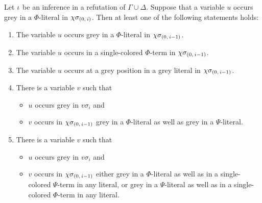 \documentclass[,%
	draft=false,%
	numbers=noendperiod
	12pt,
	a4paper,
	oneside,%
	openany,
]{memoir}
\newcommand{\inv}{\ensuremath{\chi}}
\begin{document}
\begin{lemma}
	\label{lemma:var_grey_col_lit}
	Let $\iota$ be an inference in a refutation of $\Gamma\cup\Delta$.
	Suppose that a variable $u$ occurs grey in a $\Phi$-literal in $\inv\sigmazi$.
	Then at least one of the following statements holds:
	\begin{enumerate}
		\item
			\label{14_1}
			The variable $u$ occurs grey in a $\Phi$-literal in $\inv\sigmazmi$.

		\item
			\label{14_5}
			The variable $u$ occurs in a single-colored $\Phi$-term in $\inv\sigmazmi$.

		\item
			\label{14_4}
			The variable $u$ occurs at a grey position in a grey literal in $\inv\sigmazmi$.

		\item 
			\label{14_2}
			There is a variable $v$ such that 
			{
				\renewcommand{\labelitemi}{\textendash}
				\begin{itemize}
					\item $u$ occurs grey in $v\sigma_i$ and
					\item $v$ occurs in $\inv\sigmazmi$ grey in a $\Phi$-literal as well as grey in a $\Psi$-literal.
				\end{itemize}
			}

		\item 
			\label{14_3}
			There is a variable $v$ such that
			{
				\renewcommand{\labelitemi}{\textendash}
				\begin{itemize}
					\item $u$ occurs grey in $v\sigma_i$ and
					\item
						$v$ occurs in $\inv\sigmazmi$
						either grey in a $\Phi$-literal as well as in a single-colored $\Psi$-term in any literal, 
						or grey in a $\Psi$-literal as well as in a single-colored $\Phi$-term in any literal.
				\end{itemize}
			}

	\end{enumerate}
\end{lemma}
\end{document}
